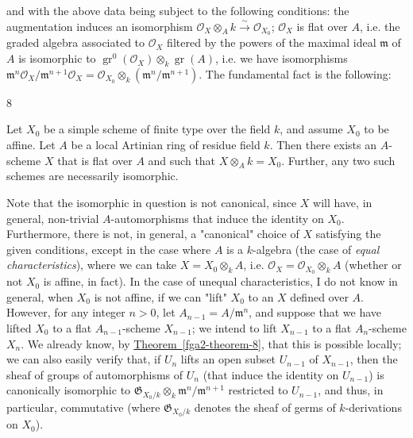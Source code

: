   and with the above data being subject to the following conditions: the augmentation induces an isomorphism \(\mathcal {O}_X\otimes _A k\xrightarrow {\sim }\mathcal {O}_{X_0}\);
  \(\mathcal {O}_X\) is flat over \(A\), i.e. the graded algebra associated to \(\mathcal {O}_X\) filtered by the powers of the maximal ideal \(\mathfrak {m}\) of \(A\) is isomorphic to \(\operatorname {gr}^0(\mathcal {O}_X)\otimes _k\operatorname {gr}(A)\), i.e. we have isomorphisms \(\mathfrak {m}^n\mathcal {O}_X/\mathfrak {m}^{n+1}\mathcal {O}_X = \mathcal {O}_{X_0}\otimes _k(\mathfrak {m}^n/\mathfrak {m}^{n+1})\).
  The fundamental fact is the following:\begin{theorem}{8}\label{fga2-theorem-8}\skipsinglepar\par{}Let \(X_0\) be a simple scheme of finite type over the field \(k\), and assume \(X_0\) to be affine.
    Let \(A\) be a local Artinian ring of residue field \(k\).
    Then there exists an \(A\)-scheme \(X\) that is flat over \(A\) and such that \(X\otimes _A k=X_0\).
    Further, any two such schemes are necessarily isomorphic.\end{theorem}\par{}Note that the isomorphic in question is not canonical, since \(X\) will have, in general, non-trivial \(A\)-automorphisms that induce the identity on \(X_0\).
  Furthermore, there is not, in general, a "canonical" choice of \(X\) satisfying the given conditions, except in the case where \(A\) is a \(k\)-algebra (the case of \emph{equal characteristics}), where we can take \(X=X_0\otimes _k A\), i.e. \(\mathcal {O}_X=\mathcal {O}_{X_0}\otimes _k A\) (whether or not \(X_0\) is affine, in fact).
  In the case of unequal characteristics, I do not know in general, when \(X_0\) is not affine, if we can "lift" \(X_0\) to an \(X\) defined over \(A\).
  However, for any integer \(n>0\), let \(A_{n-1}=A/\mathfrak {m}^n\), and suppose that we have lifted \(X_0\) to a flat \(A_{n-1}\)-scheme \(X_{n-1}\);
  we intend to lift \(X_{n-1}\) to a flat \(A_n\)-scheme \(X_n\).
  We already know, by \hyperref[fga2-theorem-8]{Theorem~\ref*{fga2-theorem-8}}, that this is possible locally;
  we can also easily verify that, if \(U_n\) lifts an open subset \(U_{n-1}\) of \(X_{n-1}\), then the sheaf of groups of automorphisms of \(U_n\) (that induce the identity on \(U_{n-1}\)) is canonically isomorphic to \(\mathfrak {G}_{X_0/k}\otimes _k\mathfrak {m}^n/\mathfrak {m}^{n+1}\) restricted to \(U_{n-1}\), and thus, in particular, commutative (where \(\mathfrak {G}_{X_0/k}\) denotes the sheaf of germs of \(k\)-derivations on \(X_0\)).

